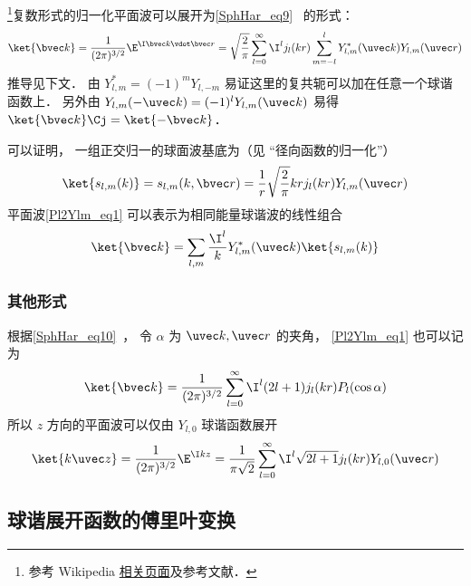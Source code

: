 

\footnote{参考 Wikipedia \href{https://en.wikipedia.org/wiki/Plane_wave_expansion}{相关页面}及参考文献．}复数形式的归一化平面波可以展开为\autoref{SphHar_eq9}~ 的形式：
\begin{equation}\label{Pl2Ylm_eq1}
\ket{\bvec k} = \frac{1}{(2\pi)^{3/2}}\E^{\I \bvec k \vdot \bvec r} = \sqrt{\frac{2}{\pi}} \sum_{l=0}^{\infty} \I^l  j_l(kr) \sum_{m=-l}^l Y_{l,m}^*(\uvec k) Y_{l,m}(\uvec r)
\end{equation}
推导见下文． 由 $Y_{l,m}^* = (-1)^m Y_{l,-m}$ 易证这里的复共轭可以加在任意一个球谐函数上． 另外由 $Y_{l,m}(-\uvec k) = (-1)^l Y_{l,m}(\uvec k)$ 易得 $\ket{\bvec k}\Cj = \ket{-\bvec k}$．

可以证明， 一组正交归一的球面波基底为（见 “径向函数的归一化”）
\begin{equation}
\ket{s_{l,m}(k)} = s_{l,m}(k,\bvec r) = \frac{1}{r}\sqrt{\frac{2}{\pi}}kr j_l(kr) Y_{l,m}(\uvec r)
\end{equation}
平面波\autoref{Pl2Ylm_eq1} 可以表示为相同能量球谐波的线性组合
\begin{equation}\label{Pl2Ylm_eq3}
\ket{\bvec k} = \sum_{l,m}\frac{\I^l}{k} Y_{l,m}^*(\uvec k)\ket{s_{l,m}(k)} 
\end{equation}

\subsubsection{其他形式}
根据\autoref{SphHar_eq10}~， 令 $\alpha$ 为 $\uvec k, \uvec r$ 的夹角， \autoref{Pl2Ylm_eq1} 也可以记为
\begin{equation}\label{Pl2Ylm_eq2}
\ket{\bvec k} = \frac{1}{(2\pi)^{3/2}} \sum_{l=0}^{\infty} \I^l (2l+1) j_l(kr) P_l(\cos\alpha)
\end{equation}
所以 $z$ 方向的平面波可以仅由 $Y_{l,0}$ 球谐函数展开
\begin{equation}
\ket{k\uvec z} = \frac{1}{(2\pi)^{3/2}}\E^{\I kz}
= \frac{1}{\pi\sqrt 2} \sum_{l=0}^{\infty} \I^l \sqrt{2l+1} j_l(kr) Y_{l,0}(\uvec r)
\end{equation}

\subsection{球谐展开函数的傅里叶变换}

